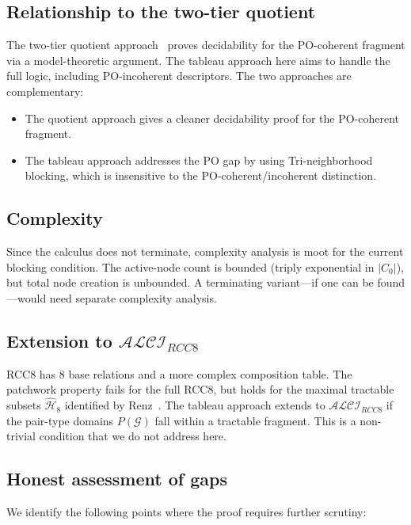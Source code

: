 \documentclass[a4paper,11pt]{article}
\theoremstyle{definition}
\newcommand{\ALCIRCC}[1]{\ensuremath{\mathcal{ALCI}_{\mathit{RCC#1}}}}
\newcommand{\GG}{\ensuremath{\mathcal{G}}}
\begin{document}
\subsection{Relationship to the two-tier quotient}

The two-tier quotient approach~\cite{TwoTier} proves
decidability for the PO-coherent fragment via a model-theoretic
argument.  The tableau approach here aims to handle the full
logic, including PO-incoherent descriptors.  The two approaches
are complementary:
\begin{itemize}[nosep]
  \item The quotient approach gives a cleaner decidability proof
    for the PO-coherent fragment.
  \item The tableau approach addresses the PO gap by using
    Tri-neighborhood blocking, which is insensitive to the
    PO-coherent/incoherent distinction.
\end{itemize}

\subsection{Complexity}

Since the calculus does not terminate, complexity analysis
is moot for the current blocking condition.  The active-node
count is bounded (triply exponential in $|C_0|$), but total
node creation is unbounded.  A terminating variant---if
one can be found---would need separate complexity analysis.

\subsection{Extension to $\ALCIRCC{8}$}

RCC8 has 8 base relations and a more complex composition table.
The patchwork property fails for the full RCC8, but holds for
the maximal tractable subsets $\hat{\mathcal{H}}_8$ identified
by Renz~\cite{Renz1999}.  The tableau approach extends to
$\ALCIRCC{8}$ if the pair-type domains $P(\GG)$ fall within
a tractable fragment.  This is a non-trivial condition that
we do not address here.

\subsection{Honest assessment of gaps}

We identify the following points where the proof requires
further scrutiny:
\end{document}
